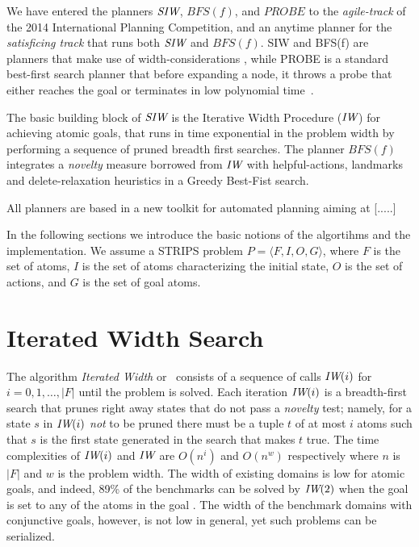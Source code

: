 \documentclass[letterpaper]{article}
\begin{document}
We have entered the planners ${\textit{SIW}}$, $BFS(f)$, and $PROBE$ to the
\emph{agile-track} of the 2014 International Planning Competition, and an anytime
planner for the \emph{satisficing track} that runs both ${\textit{SIW}}$ and $BFS(f)$.
SIW and BFS(f) are planners that make use of width-considerations \cite{nir:ecai12}, while PROBE is a standard best-first search planner that before expanding a node, it throws a probe  that
either reaches the goal or terminates in low polynomial time~\cite{nir:icaps11}.

The basic building block of ${\textit{SIW}}$ is the Iterative Width Procedure
(${\textit{IW}}$) for achieving atomic goals, that runs in time exponential in
the problem width by performing a sequence of pruned breadth first
searches.  The planner $BFS(f)$ integrates a \emph{novelty} measure
borrowed from ${\textit{IW}}$ with helpful-actions, landmarks and
delete-relaxation heuristics in a Greedy Best-Fist
search.  

 All planners are based in a new toolkit for automated planning
 \cite{} aiming at [.....]



In the following sections we introduce the basic notions of the
algortihms and the implementation. We assume a STRIPS problem $P =
\langle F,I,O,G\rangle$, where $F$ is the set of atoms, $I$ is the set
of atoms characterizing the initial state, $O$ is the set of actions,
and $G$ is the set of goal atoms.




\section{Iterated Width Search}


The algorithm  \emph{Iterated Width}  or \IR\ 
consists  of a sequence of calls ${\textit{IW}}(i)$ for $i=0,1,\ldots, |F|$
until the problem is solved. Each iteration ${\textit{IW}}(i)$ is a 
breadth-first search that prunes right away  states  that do not pass a   \emph{novelty} test; 
namely, for a state $s$ in ${\textit{IW}}(i)$ \emph{not} to be pruned there must be 
a tuple $t$ of at most $i$ atoms such that $s$ is the first state 
generated in the search that makes $t$ true. The time complexities of ${\textit{IW}}(i)$ and ${\textit{IW}}$
are  $O(n^i)$ and $O(n^w)$ respectively  where $n$ is $|F|$ and $w$ is the problem width.
The width of existing domains is low for atomic goals,  and indeed,  89\% of the  benchmarks
can be solved by ${\textit{IW}}(2)$ when the goal is set to any  of the atoms in the goal \cite{nir:ecai12}.
The width of the benchmark domains with conjunctive goals, however, is not low in general,
yet such problems can be serialized.
\end{document}
